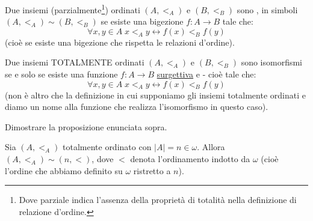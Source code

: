 \documentclass[11pt]{scrartcl}
\begin{document}
\begin{definition}[Isomorfismo]
	Due insiemi (parzialmente\footnote{Dove parziale indica l'assenza della proprietà di totalità nella definizione di relazione d'ordine.}) ordinati
	$(A,<_A)$ e $(B,<_B)$ sono , in simboli $(A,<_A) \sim (B,<_B)$ se esiste una bigezione $f : A \rightarrow B$ tale che:
	\[ \forall x,y \in A \; x <_A y \longleftrightarrow f(x) <_B f(y)
		\]
	(cioè se esiste una bigezione che rispetta le relazioni d'ordine).
\end{definition}

\begin{remark}
	Due insiemi TOTALMENTE ordinati $(A,<_A)$ e $(B,<_B)$ sono isomorfismi se e solo se esiste una funzione $f : A \rightarrow B$ \underline{surgettiva} e  - cioè tale che:
	\[ \forall x,y \in A \; x <_A y \longleftrightarrow f(x) <_B f(y)
		\]
	(non è altro che la definizione in cui supponiamo gli insiemi totalmente ordinati e diamo un nome alla funzione che realizza l'isomorfismo in questo caso).
\end{remark}

\begin{exercise}
	Dimostrare la proposizione enunciata sopra.
\end{exercise}

\begin{remark}
	Sia $(A,<_A)$ totalmente ordinato con $|A| = n \in \omega$. Allora $(A,<_A) \sim (n,<)$, dove $<$ denota l'ordinamento indotto da $\omega$ (cioè l'ordine che abbiamo definito su $\omega$ ristretto a $n$).
\end{remark}
\end{document}
